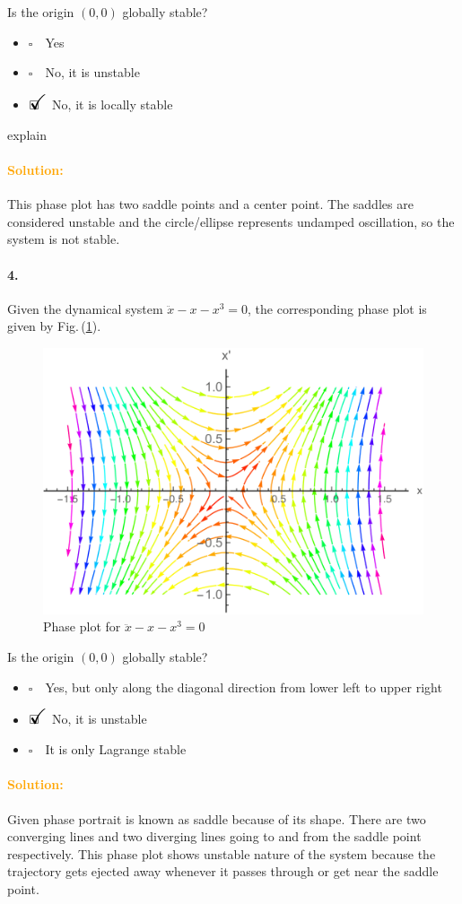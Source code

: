 \documentclass[12pt, a4paper]{article}
\newcommand{\ans}{\item[]$\rlap{\LARGE{\checkmark}}\square\quad$}
\newcommand{\noans}{\item[]$\square\quad$}
\begin{document}
Is the origin $(0,0)$ globally stable?
\begin{itemize}
\noans Yes
\noans No, it is unstable
\ans No, it is locally stable
\end{itemize}
explain

\paragraph{\textcolor{orange}{Solution:}}
This phase plot has two saddle points and a center point. The saddles are considered unstable and the circle/ellipse represents undamped oscillation, so the system is not stable.  

\paragraph{4.}
Given the dynamical system $\ddot{x}-x-x^{3}=0$, the corresponding phase plot is given by Fig.\,(\ref{fig_global_stability_phase_plot_2}).

\begin{figure}[ht]
\centering
\includegraphics[scale=0.3]{figs/fig_global_stability_phase_plot_2.png}
\caption{Phase plot for $\ddot{x}-x-x^{3}=0$}
\label{fig_global_stability_phase_plot_2}
\end{figure}

Is the origin $(0,0)$ globally stable?
\begin{itemize}
\noans Yes, but only along the diagonal direction from lower left to upper right
\ans No, it is unstable
\noans It is only Lagrange stable
\end{itemize}

\paragraph{\textcolor{orange}{Solution:}}
Given phase portrait is known as saddle because of its shape. There are two converging lines and two diverging lines going to and from the saddle point respectively. This phase plot shows unstable nature of the system because the trajectory gets ejected away whenever it passes through or get near the saddle point.
\end{document}
